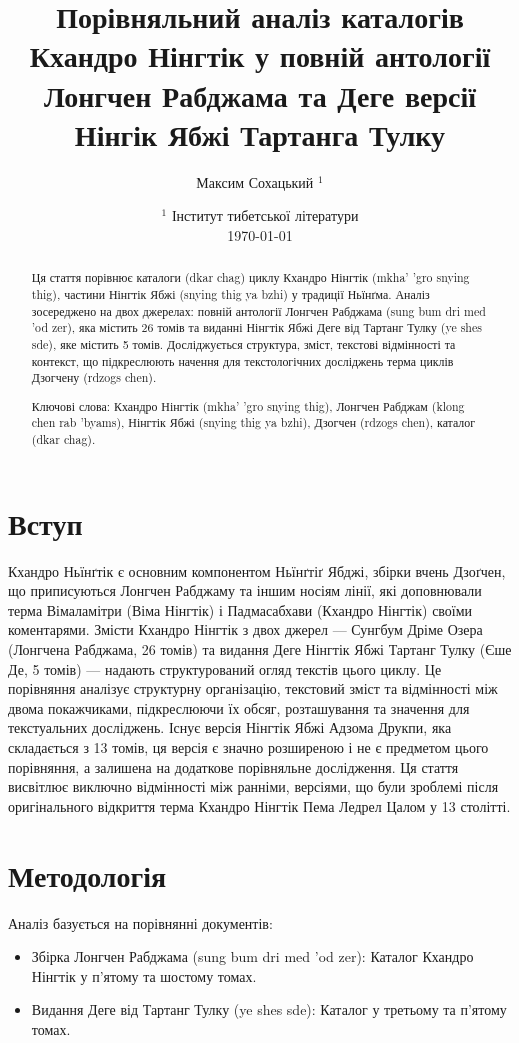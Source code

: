 \documentclass{article}
\title{  Порівняльний аналіз каталогів Кхандро Нінгтік
         у повній антології Лонгчен Рабджама та
         Деге версії Нінгік Ябжі Тартанга Тулку}
\author{ Максим Сохацький $^1$ }
\date{   $^1$ Інститут тибетської літератури \\
         \today }
\begin{document}
\maketitle

\begin{abstract}
Ця стаття порівнює каталоги (dkar chag) циклу Кхандро Нінгтік (mkha' 'gro snying thig),
частини Нінгтік Ябжі (snying thig ya bzhi) у традиції Ньїнґма. Аналіз зосереджено на двох
джерелах: повній антології Лонгчен Рабджама (sung bum dri med 'od zer), яка містить 26 томів
та виданні Нінгтік Ябжі Деге від Тартанг Тулку (ye shes sde), яке містить 5 томів.
Досліджується структура, зміст, текстові відмінності та контекст, що підкреслюють
начення для текстологічних досліджень терма циклів Дзогчену (rdzogs chen).

Ключові слова: Кхандро Нінгтік (mkha' 'gro snying thig), Лонгчен Рабджам (klong chen rab 'byams),
  Нінгтік Ябжі (snying thig ya bzhi), Дзогчен (rdzogs chen), каталог (dkar chag).
\end{abstract}

\newpage
\tableofcontents

\newpage

\section{Вступ}

Кхандро Ньїнґтік є основним компонентом Ньїнґтіґ Ябджі, збірки вчень Дзоґчен,
що приписуються Лонгчен Рабджаму та іншим носіям лінії, які доповнювали терма
Вімаламітри (Віма Нінгтік) і Падмасабхави (Кхандро Нінгтік) своїми коментарями.
Змісти Кхандро Нінгтік з двох джерел — Сунгбум Дріме Озера (Лонгчена Рабджама, 26 томів) та видання
Деге Нінгтік Ябжі Тартанг Тулку (Єше Де, 5 томів) — надають структурований огляд текстів цього циклу.
Це порівняння аналізує структурну організацію, текстовий зміст та відмінності між
двома покажчиками, підкреслюючи їх обсяг, розташування та значення для текстуальних досліджень.
Існує версія Нінгтік Ябжі Адзома Друкпи, яка складається з 13 томів, ця версія є значно розширеною
і не є предметом цього порівняння, а залишена на додаткове порівняльне дослідження. Ця стаття
висвітлює виключно відмінності між ранніми, версіями, що були зроблемі після оригінального відкриття
терма Кхандро Нінгтік Пема Ледрел Цалом у 13 столітті.

\section{Методологія}
Аналіз базується на порівнянні документів:
\begin{itemize}
    \item Збірка Лонгчен Рабджама (sung bum dri med 'od zer): Каталог Кхандро Нінгтік у п'ятому та шостому томах.
    \item Видання Деге від Тартанг Тулку (ye shes sde): Каталог у третьому та п'ятому томах.
\end{itemize}
\end{document}
